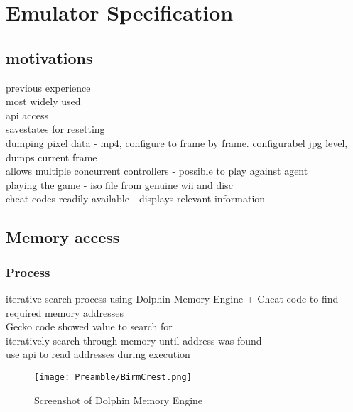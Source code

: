 
\chapter{Emulator Specification}
\section{motivations}
\cite{DolphinEmulator}
previous experience\\ 
most widely used\\
api access\cite{DolphinWithScriptingSupport}\\
savestates for resetting\\
dumping pixel data - mp4, configure to frame by frame. configurabel jpg level, dumps current frame\\
allows multiple concurrent controllers - possible to play against agent\\
playing the game - iso file from genuine wii and disc\\
cheat codes readily available - displays relevant information

\section{Memory access}
\subsection{Process}
iterative search process using Dolphin Memory Engine + Cheat code to find required memory addresses \cite{DolphinMemoryEngine}
\\Gecko code showed value to search for
\\ iteratively search through memory until address was found 
\\ use api to read addresses during execution
\begin{figure}
    \centering
    \texttt{[image: Preamble/BirmCrest.png]}
    \caption{Screenshot of Dolphin Memory Engine}
    \label{fig:dme}
\end{figure}
